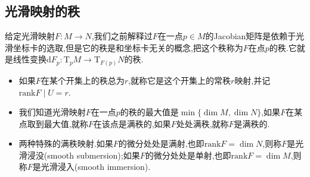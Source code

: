\subsection{光滑映射的秩}

给定光滑映射$F:M\to N$,我们之前解释过$F$在一点$p\in M$的Jacobian矩阵是依赖于光滑坐标卡的选取,但是它的秩是和坐标卡无关的概念,把这个秩称为$F$在点$p$的秩.它就是线性变换$\mathrm{d}F_p:\mathrm{T}_pM\to\mathrm{T}_{F(p)}N$的秩.
\begin{itemize}
	\item 如果$F$在某个开集上的秩总为$r$,就称它是这个开集上的常秩$r$映射,并记$\mathrm{rank}F\mid U=r$.
	\item 我们知道光滑映射$F$在一点$p$的秩的最大值是$\min\{\dim M,\dim N\}$,如果$F$在某点取到最大值,就称$F$在该点是满秩的,如果$F$处处满秩,就称$F$是满秩的.
	\item 两种特殊的满秩映射.如果$F$的微分处处是满射,也即$\mathrm{rank}F=\dim N$,则称$F$是光滑浸没(smooth submersion);如果$F$的微分处处是单射,也即$\mathrm{rank}F=\dim M$,则称$F$是光滑浸入(smooth immersion).
\end{itemize}
